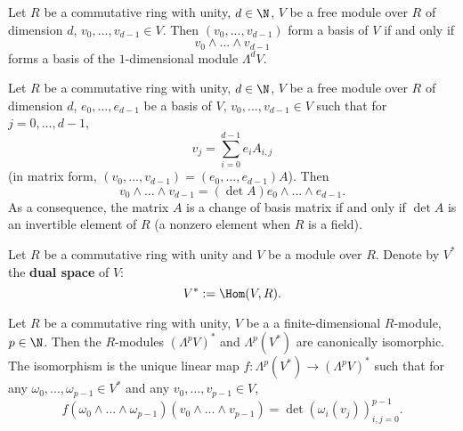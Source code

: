 \begin{proposition}
  Let
    $R$ be a commutative ring with unity,
    $d \in \N$,
    $V$ be a free module over $R$ of dimension $d$,
    $v_0, ..., v_{d - 1} \in V$.
  Then $(v_0, ..., v_{d - 1})$ form a basis of $V$ if and only if
  \begin{equation}
    v_0 \wedge ... \wedge v_{d - 1}
  \end{equation}
  forms a basis of the $1$-dimensional module $\Lambda^d V$.
\end{proposition}
\begin{proposition}
  Let
    $R$ be a commutative ring with unity,
    $d \in \N$,
    $V$ be a free module over $R$ of dimension $d$,
    $e_0, ..., e_{d - 1}$ be a basis of $V$,
    $v_0, ..., v_{d - 1} \in V$ such that for $j = 0, ..., d - 1$,
  \begin{equation}
    v_j = \sum_{i = 0}^{d - 1} e_i A_{i, j}
  \end{equation}
  (in matrix form, $(v_0, ..., v_{d - 1}) = (e_0, ..., e_{d - 1}) A$).
  Then
  \begin{equation}
    v_0 \wedge ... \wedge v_{d - 1} = (\det A) e_0 \wedge ... \wedge e_{d - 1}.
  \end{equation}
  As a consequence, the matrix $A$ is a change of basis matrix if and only if
  $\det A$ is an invertible element of $R$
  (a nonzero element when $R$ is a field).
\end{proposition}
\begin{notation}
  Let $R$ be a commutative ring with unity and $V$ be a module over $R$.
  Denote by $V^*$ the \textbf{dual space} of $V$:
  \begin{equation}
    V^* := \Hom(V, R).
  \end{equation}
\end{notation}
\begin{proposition}
  Let
    $R$ be a commutative ring with unity,
    $V$ be a a finite-dimensional $R$-module,
    $p \in \N$.
  Then the $R$-modules $(\Lambda^p V)^*$ and $\Lambda^p (V^*)$
  are canonically isomorphic.
  The isomorphism is the unique linear map
  $f \colon \Lambda^p (V^*) \to (\Lambda^p V)^*$ such that
  for any $\omega_0, ..., \omega_{p - 1} \in V^*$
  and any $v_0, ..., v_{p - 1} \in V$,
  \begin{equation}
    f(\omega_0 \wedge ... \wedge \omega_{p - 1})
    (v_0 \wedge ... \wedge v_{p - 1})
    = \det (\omega_i(v_j))_{i, j = 0}^{p - 1}.
  \end{equation}
\end{proposition}
